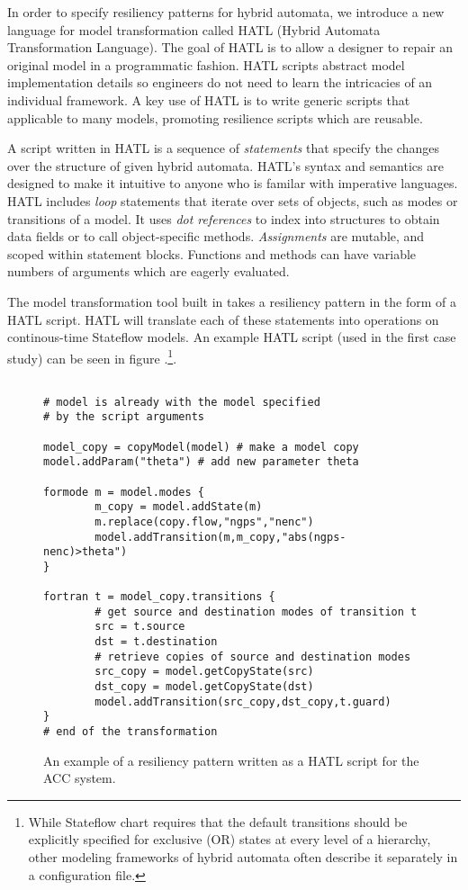 In order to specify resiliency patterns for hybrid automata, we
introduce a new language for model transformation called HATL (Hybrid
Automata Transformation Language). The goal of HATL is to allow a
designer to repair an original model in a programmatic fashion. HATL
scripts abstract model implementation details so engineers do not need
to learn the intricacies of an individual framework. A key use of HATL
is to write generic scripts that applicable to many models, promoting
resilience scripts which are reusable.

A script written in HATL is a sequence of \emph{statements} that
specify the changes over the structure of given hybrid
automata. HATL's syntax and semantics are designed to make it
intuitive to anyone who is familar with imperative languages. HATL
includes \emph{loop} statements that iterate over sets of objects,
such as modes or transitions of a model. It uses \emph{dot references}
to index into structures to obtain data fields or to call
object-specific methods. \emph{Assignments} are mutable, and scoped
within statement blocks. Functions and methods can have variable
numbers of arguments which are eagerly evaluated.

The model transformation tool built in \toolreaffirm takes a
resiliency pattern in the form of a HATL script. HATL will translate
each of these statements into operations on continous-time Stateflow
models. An example HATL script (used in the first case study) can be
seen in figure .\footnote{While Stateflow chart requires that the default transitions should be explicitly specified for exclusive (OR) states at every level of a hierarchy, other modeling frameworks of hybrid automata often describe it separately in a configuration file.}.
%

\begin{figure}[!t]%
\begin{lstlisting}[basicstyle=\ttfamily\footnotesize, numbers=none]

# model is already with the model specified
# by the script arguments

model_copy = copyModel(model) # make a model copy
model.addParam("theta") # add new parameter theta

formode m = model.modes {
		m_copy = model.addState(m)
		m.replace(copy.flow,"ngps","nenc")
		model.addTransition(m,m_copy,"abs(ngps-nenc)>theta")
}

fortran t = model_copy.transitions {
		# get source and destination modes of transition t
		src = t.source
		dst = t.destination
		# retrieve copies of source and destination modes
		src_copy = model.getCopyState(src)
		dst_copy = model.getCopyState(dst)
		model.addTransition(src_copy,dst_copy,t.guard)
}
# end of the transformation
\end{lstlisting}
\caption{An example of a resiliency pattern written as a HATL script for the ACC system.}%
%
\end{figure}

